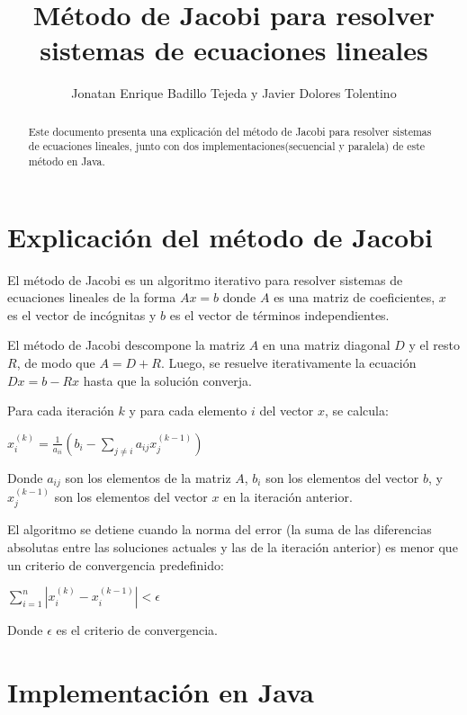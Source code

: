 \documentclass[]{article}
\title{Método de Jacobi para resolver sistemas de ecuaciones lineales}
\author{Jonatan Enrique Badillo Tejeda y Javier Dolores Tolentino}
\begin{document}
\maketitle

\begin{abstract}
Este documento presenta una explicación del método de Jacobi para resolver sistemas de ecuaciones lineales, junto con dos implementaciones(secuencial y paralela) de este método en Java.
\end{abstract}

\section{Explicación del método de Jacobi}

El método de Jacobi es un algoritmo iterativo para resolver sistemas de ecuaciones lineales de la forma $Ax=b$ donde $A$ es una matriz de coeficientes, $x$ es el vector de incógnitas y $b$ es el vector de términos independientes.

El método de Jacobi descompone la matriz $A$ en una matriz diagonal $D$ y el resto $R$, de modo que $A=D+R$. Luego, se resuelve iterativamente la ecuación $Dx=b-Rx$ hasta que la solución converja.

Para cada iteración $k$ y para cada elemento $i$ del vector $x$, se calcula:

$x_i^{(k)} = \frac{1}{a_{ii}} \left( b_i - \sum_{j \neq i} a_{ij} x_j^{(k-1)} \right)$

Donde $a_{ij}$ son los elementos de la matriz $A$, $b_i$ son los elementos del vector $b$, y $x_j^{(k-1)}$ son los elementos del vector $x$ en la iteración anterior.

El algoritmo se detiene cuando la norma del error (la suma de las diferencias absolutas entre las soluciones actuales y las de la iteración anterior) es menor que un criterio de convergencia predefinido:

$\sum_{i=1}^{n} |x_i^{(k)} - x_i^{(k-1)}| < \epsilon$

Donde $\epsilon$ es el criterio de convergencia.

\section{Implementación en Java}
\end{document}
